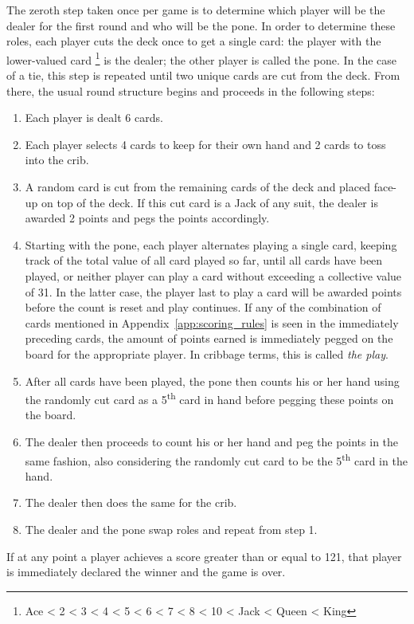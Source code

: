 The zeroth step taken once per game is to determine which player will be the
dealer for the first round and who will be the pone.
%
%
In order to determine these roles,
each player cuts the deck once to get a single card:
the player with the lower-valued card%
\footnote{Ace < 2 < 3 < 4 < 5 < 6 < 7 < 8 < 10 < Jack < Queen < King}
is the dealer;
the other player is called the pone.
In the case of a tie, this step is repeated until two unique cards are
cut from the deck.
%
From there, the usual round structure begins and proceeds in the following
steps:
%
\begin{enumerate}
%
\item Each player is dealt 6 cards.
%
\item Each player selects 4 cards to keep for their own hand and 2 cards to
	toss into the crib.
%
\item A random card is cut from the remaining cards of the deck and placed
	face-up on top of the deck.
	If this cut card is a Jack of any suit,
	the dealer is awarded 2 points and pegs the points accordingly.
%
\item Starting with the pone, each player alternates playing a single card,
	keeping track of the total value of all card played so far,
	until all cards have been played,
	or neither player can play a card without exceeding a collective value of
	31.
	In the latter case, the player last to play a card will be awarded points
	before the count is reset and play continues.
	If any of the combination of cards mentioned in
	Appendix~\ref{app:scoring_rules} is seen in the immediately preceding cards,
	the amount of points earned is immediately pegged on the board for the
	appropriate player.
	In cribbage terms, this is called \textit{the play}.
%
\item After all cards have been played,
	the pone then counts his or her hand using the randomly cut card as a
	5\textsuperscript{th} card in hand before pegging these points on the board.
%
\item The dealer then proceeds to count his or her hand and peg the points
	in the same fashion, also considering the randomly cut card to be the
	5\textsuperscript{th} card in the hand.
%
\item The dealer then does the same for the crib.
%
\item The dealer and the pone swap roles and repeat from step 1.
%
\end{enumerate}
%
If at any point a player achieves a score greater than or equal to 121,
that player is immediately declared the winner and the game is over.


